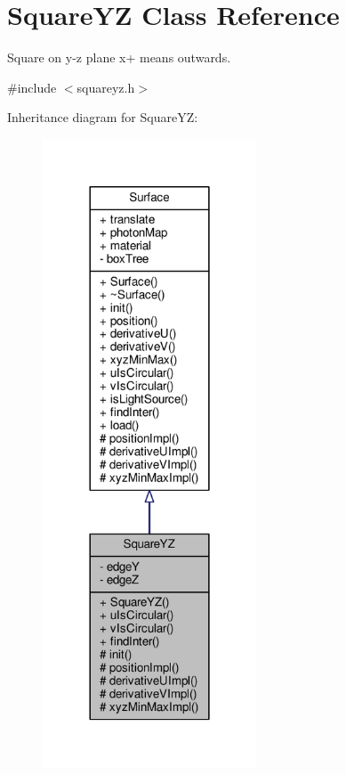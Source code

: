 \hypertarget{classSquareYZ}{}\section{Square\+YZ Class Reference}
\label{classSquareYZ}


Square on y-\/z plane x+ means outwards.  




{\ttfamily \#include $<$squareyz.\+h$>$}



Inheritance diagram for Square\+YZ\+:\nopagebreak
\begin{figure}[H]
\begin{center}
\leavevmode
\includegraphics[width=180pt]{classSquareYZ__inherit__graph}
\end{center}
\end{figure}


